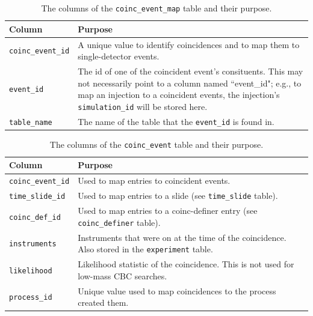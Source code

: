 \begin{table}[p]
\label{tab:coinc_event_map}
\center
\begin{tabular}{l | p{10cm}}
Column      &   Purpose     \\
\hline \hline
\texttt{coinc\_event\_id}   &   A unique value to identify coincidences and to map them to single-detector events. \\
\hline
\texttt{event\_id}  & The id of one of the coincident event's consituents. This may not necessarily point to a column named ``event\_id"; e.g., to map an injection to a coincident events, the injection's \texttt{simulation\_id} will be stored here. \\
\hline
\texttt{table\_name}    &   The name of the table that the \texttt{event\_id} is found in.
\end{tabular}
\caption{The columns of the \texttt{coinc\_event\_map} table and their purpose.}
\end{table}

\begin{table}[p]
\label{tab:coinc_event}
\center
\begin{tabular}{l | p{10cm}}
Column      &   Purpose     \\
\hline \hline
\texttt{coinc\_event\_id}   &   Used to map entries to coincident events. \\
\hline
\texttt{time\_slide\_id}    &   Used to map entries to a slide (see \texttt{time\_slide} table). \\
\hline
\texttt{coinc\_def\_id}     &   Used to map entries to a coinc-definer entry (see \texttt{coinc\_definer} table). \\
\hline
\texttt{instruments}        &   Instruments that were on at the time of the coincidence. Also stored in the \texttt{experiment} table. \\
\hline
\texttt{likelihood}         &   Likelihood statistic of the coincidence. This is not used for low-mass \ac{CBC} searches. \\
\hline
\texttt{process\_id}        &   Unique value used to map coincidences to the process created them.
\end{tabular}
\caption{The columns of the \texttt{coinc\_event} table and their purpose.}
\end{table}

